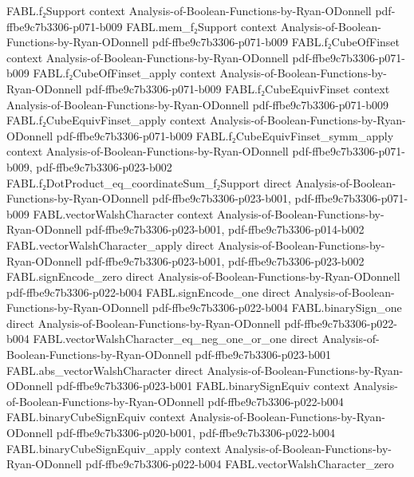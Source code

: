 \begin{theorem}
  {FABL.f₂Support}
  {context}
  {Analysis-of-Boolean-Functions-by-Ryan-ODonnell}
  {pdf-ffbe9c7b3306-p071-b009}
\proofstep
  {FABL.mem_f₂Support}
  {context}
  {Analysis-of-Boolean-Functions-by-Ryan-ODonnell}
  {pdf-ffbe9c7b3306-p071-b009}
\proofstep
  {FABL.f₂CubeOfFinset}
  {context}
  {Analysis-of-Boolean-Functions-by-Ryan-ODonnell}
  {pdf-ffbe9c7b3306-p071-b009}
\proofstep
  {FABL.f₂CubeOfFinset_apply}
  {context}
  {Analysis-of-Boolean-Functions-by-Ryan-ODonnell}
  {pdf-ffbe9c7b3306-p071-b009}
\proofstep
  {FABL.f₂CubeEquivFinset}
  {context}
  {Analysis-of-Boolean-Functions-by-Ryan-ODonnell}
  {pdf-ffbe9c7b3306-p071-b009}
\proofstep
  {FABL.f₂CubeEquivFinset_apply}
  {context}
  {Analysis-of-Boolean-Functions-by-Ryan-ODonnell}
  {pdf-ffbe9c7b3306-p071-b009}
\proofstep
  {FABL.f₂CubeEquivFinset_symm_apply}
  {context}
  {Analysis-of-Boolean-Functions-by-Ryan-ODonnell}
  {pdf-ffbe9c7b3306-p071-b009,
    pdf-ffbe9c7b3306-p023-b002}
\proofstep
  {FABL.f₂DotProduct_eq_coordinateSum_f₂Support}
  {direct}
  {Analysis-of-Boolean-Functions-by-Ryan-ODonnell}
  {pdf-ffbe9c7b3306-p023-b001,
    pdf-ffbe9c7b3306-p071-b009}
\proofstep
  {FABL.vectorWalshCharacter}
  {context}
  {Analysis-of-Boolean-Functions-by-Ryan-ODonnell}
  {pdf-ffbe9c7b3306-p023-b001,
    pdf-ffbe9c7b3306-p014-b002}
\proofstep
  {FABL.vectorWalshCharacter_apply}
  {direct}
  {Analysis-of-Boolean-Functions-by-Ryan-ODonnell}
  {pdf-ffbe9c7b3306-p023-b001,
    pdf-ffbe9c7b3306-p023-b002}
\proofstep
  {FABL.signEncode_zero}
  {direct}
  {Analysis-of-Boolean-Functions-by-Ryan-ODonnell}
  {pdf-ffbe9c7b3306-p022-b004}
\proofstep
  {FABL.signEncode_one}
  {direct}
  {Analysis-of-Boolean-Functions-by-Ryan-ODonnell}
  {pdf-ffbe9c7b3306-p022-b004}
\proofstep
  {FABL.binarySign_one}
  {direct}
  {Analysis-of-Boolean-Functions-by-Ryan-ODonnell}
  {pdf-ffbe9c7b3306-p022-b004}
\proofstep
  {FABL.vectorWalshCharacter_eq_neg_one_or_one}
  {direct}
  {Analysis-of-Boolean-Functions-by-Ryan-ODonnell}
  {pdf-ffbe9c7b3306-p023-b001}
\proofstep
  {FABL.abs_vectorWalshCharacter}
  {direct}
  {Analysis-of-Boolean-Functions-by-Ryan-ODonnell}
  {pdf-ffbe9c7b3306-p023-b001}
\proofstep
  {FABL.binarySignEquiv}
  {context}
  {Analysis-of-Boolean-Functions-by-Ryan-ODonnell}
  {pdf-ffbe9c7b3306-p022-b004}
\proofstep
  {FABL.binaryCubeSignEquiv}
  {context}
  {Analysis-of-Boolean-Functions-by-Ryan-ODonnell}
  {pdf-ffbe9c7b3306-p020-b001,
    pdf-ffbe9c7b3306-p022-b004}
\proofstep
  {FABL.binaryCubeSignEquiv_apply}
  {context}
  {Analysis-of-Boolean-Functions-by-Ryan-ODonnell}
  {pdf-ffbe9c7b3306-p022-b004}
\proofstep
  {FABL.vectorWalshCharacter_zero}

\end{theorem}
